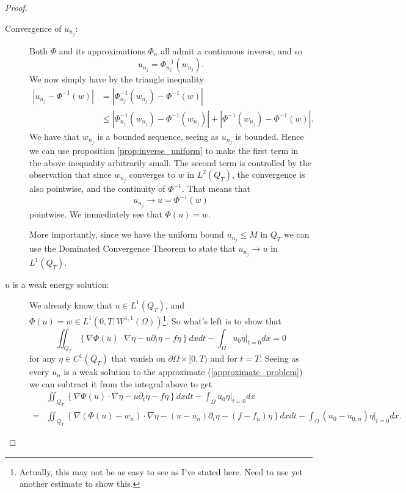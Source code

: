 \documentclass[11pt, a4paper]{article}
\begin{document}
\begin{proof}
\begin{description}
	\item[Convergence of $u_{n_j}$:] Both $\Phi$ and its approximations $\Phi_n$ all admit a continuous inverse, and so
	\begin{equation*}
	u_{n_j} = \Phi_{n_j}^{-1}(w_{n_j}).
	\end{equation*}
	We now simply have by the triangle inequality
	\begin{align*}
	|u_{n_j} - \Phi^{-1}(w)| &= |\Phi_{n_j}^{-1}(w_{n_j}) - \Phi^{-1}(w)| \\
		&\leq |\Phi_{n_j}^{-1}(w_{n_j}) - \Phi^{-1}(w_{n_j})| + |\Phi^{-1}(w_{n_j}) - \Phi^{-1}(w)|.
	\end{align*}
	 We have that $w_{n_j}$ is a bounded sequence, seeing as $u_{n_j}$ is bounded. Hence we can use proposition \ref{prop:inverse_uniform} to make the first term in the above inequality arbitrarily small. The second term is controlled by the observation that since $w_{n_j}$ converges to $w$ in $L^2(Q_T)$, the convergence is also pointwise, and the continuity of $\Phi^{-1}$. That means that
	 \begin{equation*}
	 u_{n_j} \to u = \Phi^{-1}(w)
	 \end{equation*}
	 pointwise. We immediately see that $\Phi(u) = w$.
	 
	 More importantly, since we have the uniform bound $u_{n_j} \leq M$ in $Q_T$ we can use the Dominated Convergence Theorem to state that $u_{n_j} \to u$ in $L^1(Q_T)$.
	
	 
	\item[$u$ is a weak energy solution:] We already know that $u \in L^1(Q_T)$, and $\Phi(u)=w \in L^1(0,T: W^{1,1}(\Omega))$\footnote{Actually, this may not be as easy to see as I've stated here. Need to use yet another estimate to show this.}. So what's left is to show that
	\begin{equation}
	\label{claim_weak_solution}
	\iint_{Q_T}\left\{ \nabla\Phi(u) \cdot \nabla \eta - u\partial_t \eta - f\eta \right\}dxdt - \int_\Omega u_0\eta\big|_{t=0}dx = 0
	\end{equation}
	for any $\eta \in C^1(\overline{Q}_T)$ that vanish on $\partial \Omega \times [0,T)$ and for $t=T$. Seeing as every $u_n$ is a weak solution to the approximate (\ref{approximate_problem}) we can subtract it from the integral above to get
	\begin{align*}
	&\iint_{Q_T}\left\{ \nabla\Phi(u) \cdot \nabla \eta - u\partial_t \eta - f\eta \right\}dxdt - \int_\Omega u_0\eta\big|_{t=0}dx \\
	= &\iint_{Q_T}\left\{ \nabla(\Phi(u)-w_n) \cdot \nabla \eta - (u-u_n)\partial_t \eta - (f-f_n)\eta \right\}dxdt - \int_\Omega (u_0-u_{0,n})\eta\big|_{t=0}dx.
	\end{align*}
	

\end{description}
\end{proof}
\end{document}
